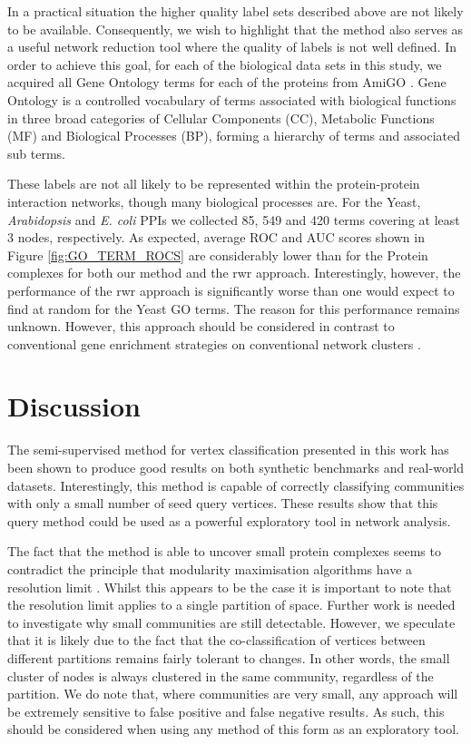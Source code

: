 \documentclass[sigconf]{acmart}
\begin{document}
In a practical situation the higher quality label sets described above are not likely to be available.
Consequently, we wish to highlight that the method also serves as a useful network reduction tool where the quality of labels is not well defined.
In order to achieve this goal, for each of the biological data sets in this study, we acquired all Gene Ontology terms for each of the proteins from AmiGO \cite{carbon2008amigo}.
Gene Ontology is a controlled vocabulary of terms associated with biological functions in three broad categories of Cellular Components (CC),  Metabolic Functions (MF) and Biological Processes (BP), forming a hierarchy of terms and associated sub terms.

These labels are not all likely to be represented within the protein-protein interaction networks, though many biological processes are.
For the Yeast, \textit{Arabidopsis} and \textit{E. coli} PPIs we collected 85, 549 and 420 terms covering at least 3 nodes, respectively.
As expected, average ROC and AUC scores shown in Figure \ref{fig:GO_TERM_ROCS} are considerably lower than for the Protein complexes for both our method and the rwr approach. 
Interestingly, however, the performance of the rwr approach is significantly worse than one would expect to find at random for the Yeast GO terms.
The reason for this performance remains unknown.
However, this approach should be considered in contrast to conventional gene enrichment strategies on conventional network clusters \cite{chen2013enrichr}.

\section{Discussion}
The semi-supervised method for vertex classification presented in this work has been shown to produce good results on both synthetic benchmarks and real-world datasets.
Interestingly, this method is capable of correctly classifying communities with only a small number of seed query vertices.
These results show that this query method could be used as a powerful exploratory tool in network analysis.

The fact that the method is able to uncover small protein complexes seems to contradict the principle that modularity maximisation algorithms have a resolution limit \cite{fortunato2007resolution}.
Whilst this appears to be the case it is important to note that the resolution limit applies to a single partition of space.
Further work is needed to investigate why small communities are still detectable.
However, we speculate that it is likely due to the fact that the co-classification of vertices between different partitions remains fairly tolerant to changes.
In other words, the small cluster of nodes is always clustered in the same community, regardless of the partition.
We do note that, where communities are very small, any approach will be extremely sensitive to false positive and false negative results.
As such, this should be considered when using any method of this form as an exploratory tool.
\end{document}
